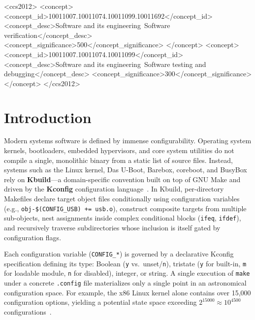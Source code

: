 \documentclass[acmsmall,screen,review]{acmart}
\begin{document}
\begin{CCSXML}
<ccs2012>
<concept>
<concept_id>10011007.10011074.10011099.10011692</concept_id>
<concept_desc>Software and its engineering~Software verification</concept_desc>
<concept_significance>500</concept_significance>
</concept>
<concept>
<concept_id>10011007.10011074.10011099</concept_id>
<concept_desc>Software and its engineering~Software testing and debugging</concept_desc>
<concept_significance>300</concept_significance>
</concept>
</ccs2012>
\end{CCSXML}



\maketitle

\section{Introduction}
\label{sec:intro}

Modern systems software is defined by immense configurability. Operating system kernels, bootloaders, embedded hypervisors, and core system utilities do not compile a single, monolithic binary from a static list of source files. Instead, systems such as the Linux kernel, Das U-Boot, Barebox, coreboot, and BusyBox rely on \textbf{Kbuild}---a domain-specific convention built on top of GNU Make and driven by the \textbf{Kconfig} configuration language~\cite{berger2010variability,dietrich2012variability,kmax,tartler2011dead}. In Kbuild, per-directory Makefiles declare target object files conditionally using configuration variables (e.g., \texttt{obj-\$(CONFIG\_USB) += usb.o}), construct composite targets from multiple sub-objects, nest assignments inside complex conditional blocks (\texttt{ifeq}, \texttt{ifdef}), and recursively traverse subdirectories whose inclusion is itself gated by configuration flags.

Each configuration variable (\texttt{CONFIG\_*}) is governed by a declarative Kconfig specification defining its type: Boolean (\texttt{y} vs.\ unset/\texttt{n}), tristate (\texttt{y} for built-in, \texttt{m} for loadable module, \texttt{n} for disabled), integer, or string. A single execution of \texttt{make} under a concrete \texttt{.config} file materializes only a single point in an astronomical configuration space. For example, the x86 Linux kernel alone contains over 15,000 configuration options, yielding a potential state space exceeding $2^{15000} \approx 10^{4500}$ configurations~\cite{tartler2011dead,liebig2010analysis,apel2013feature,berger2013variability}.
\end{document}
